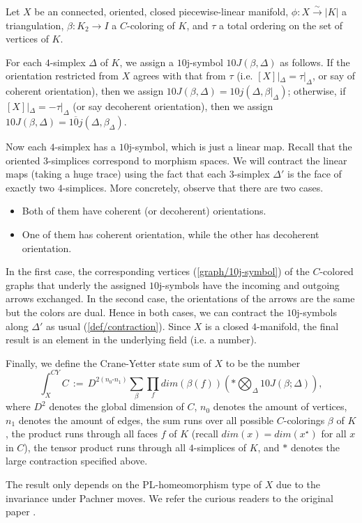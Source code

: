 \begin{definition}\label{def/crane-yetter-state-sum-for-a-closed-4-manifold}
  Let $X$ be an connected, oriented, closed piecewise-linear
  manifold, $\phi: X \xrightarrow{\sim} |K|$ a triangulation,
  $\beta: K_{2} \to I$ a $C$-coloring of $K$, and $\tau$ a total
  ordering on the set of vertices of $K$.

  For each $4$-simplex $\Delta$ of $K$, we assign a $10$j-symbol
  $10J(\beta,\Delta)$ as follows. If the orientation restricted
  from $X$ agrees with that from $\tau$ (i.e.
  $[X]|_{\Delta} = \tau|_{\Delta}$, or say of coherent
  orientation), then we assign
  $10J(\beta,\Delta) = 10j(\Delta,\beta|_{\Delta})$; otherwise,
  if $[X]|_{\Delta} = -\tau|_{\Delta}$ (or say decoherent
  orientation), then we assign
  $10J(\beta,\Delta) = \overline{10j}(\Delta,\beta_{\Delta})$.

  Now each $4$-simplex has a $10$j-symbol, which is
  just a linear map. Recall that the oriented $3$-simplices
  correspond to morphism spaces. We will contract the linear maps
  (taking a huge trace) using the fact that each $3$-simplex
  $\Delta'$ is the face of exactly two $4$-simplices. More
  concretely, observe that there are two cases.
  \begin{itemize}
    \item Both of them have coherent (or decoherent) orientations.
    \item One of them has coherent orientation, while the other
          has decoherent orientation.
  \end{itemize}
  In the first case, the corresponding vertices
  (\ref{graph/10j-symbol}) of the $C$-colored graphs that underly
  the assigned $10$j-symbols have the incoming and outgoing
  arrows exchanged. In the second case, the orientations of the
  arrows are the same but the colors are dual. Hence in both
  cases, we can contract the $10$j-symbols along $\Delta'$ as
  usual (\ref{def/contraction}). Since $X$ is a closed
  $4$-manifold, the final result is an element in the underlying
  field (i.e. a number).

  Finally, we define the Crane-Yetter state sum of $X$ to be the
  number
  $$\int_{X}^{CY} C \, := \, D^{2(n_{0}\text{-}n_{1})} \sum_{\beta} \prod_{f} dim(\beta(f)) \left(\ast \bigotimes_{\Delta} 10J(\beta;\Delta)\right),$$
  where $D^{2}$ denotes the global dimension of $C$, $n_{0}$
  denotes the amount of vertices, $n_{1}$ denotes the amount of
  edges, the sum runs over all possible $C$-colorings $\beta$ of
  $K$, the product runs through all faces $f$ of $K$ (recall
  $dim(x)=dim(x^{\star})$ for all $x$ in $C$), the tensor product
  runs through all $4$-simplices of $K$, and $\ast$ denotes the
  large contraction specified above.

  The result only depends on the PL-homeomorphism type of $X$ due
  to the invariance under Pachner moves. We refer the curious
  readers to the original paper
  \cite{crane-yetter/a-categorical-construction-of-4d-tqft}
  \cite{crane-kauffman-yetter/crane-yetter-state-sum}.
\end{definition}

